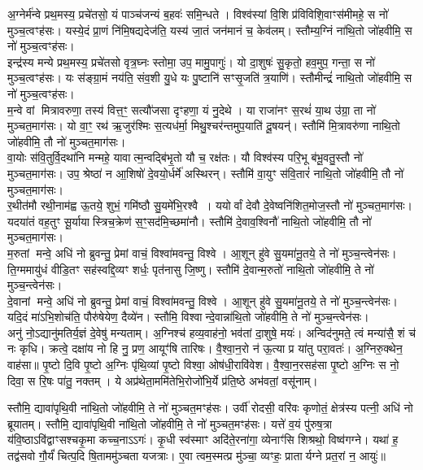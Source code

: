 अ॒ग्नेर्म॑न्वे प्रथ॒मस्य॒ प्रचे॑तसो॒ यं पाञ्च॑जन्यं ब॒हवः॑ समि॒न्धते। विश्व॑स्यां वि॒शि प्र॑विविशि॒वाꣳस॑मीमहे॒ स नो॑ मुञ्च॒त्वꣳह॑सः। यस्ये॒दं प्रा॒णं नि॑मि॒षद्यदेज॑ति॒ यस्य॑ जा॒तं जन॑मानं च॒ केव॑लम्। स्तौम्य॒ग्निं ना॑थि॒तो जो॑हवीमि॒ स नो॑ मुञ्च॒त्वꣳह॑सः।\\
इन्द्र॑स्य मन्ये प्रथ॒मस्य॒ प्रचे॑तसो वृत्र॒घ्नः स्तोमा॒ उप॒ मामु॒पागुः॑। यो दा॒शुषः॑ सु॒कृतो॒ हव॒मुप॒ गन्ता॒ स नो॑ मुञ्च॒त्वꣳह॑सः। यः स॑ङ्ग्रा॒मं नय॑ति॒ संव॒शी यु॒धे यः पु॒ष्टानि॑ सꣳसृ॒जति॑ त्र॒याणि॑। स्तौमीन्द्रं॑ नाथि॒तो जो॑हवीमि॒ स नो॑ मुञ्च॒त्वꣳह॑सः।\\
म॒न्वे वां मित्रावरुणा॒ तस्य॑ वित्त॒ꣳ॒ सत्यौ॑जसा दृꣳहणा॒ यं नु॒देथे। या राजा॑नꣳ स॒रथं॑ या॒थ उ॑ग्रा॒ ता नो॑ मुञ्चत॒माग॑सः। यो वा॒ꣳ॒ रथ॑ ऋ॒जुर॑श्मिः स॒त्यध॑र्मा॒ मिथु॒श्चर॑न्तमुप॒याति॑ दू॒षयन्॑। स्तौमि॑ मि॒त्रावरु॑णा नाथि॒तो जो॑हवीमि॒ तौ नो॑ मुञ्चत॒माग॑सः।\\
वा॒योः स॑वि॒तुर्वि॒दथा॑नि मन्महे॒ यावात्म॒न्वद्बि॑भृ॒तो यौ च॒ रक्ष॑तः। यौ विश्व॑स्य परि॒भू ब॑भू॒वतु॒स्तौ नो॑ मुञ्चत॒माग॑सः। उप॒ श्रेष्ठा॑ न आ॒शिषो॑ दे॒वयो॒र्धर्मे॑ अस्थिरन्। स्तौमि॑ वा॒युꣳ स॑वि॒तारं॑ नाथि॒तो जो॑हवीमि॒ तौ नो॑ मुञ्चत॒माग॑सः।\\
र॒थीत॑मौ रथी॒नाम॑ह्व ऊ॒तये॒ शुभं॒ गमि॑ष्ठौ सु॒यमे॑भि॒रश्वै। ययोर्वां देवौ दे॒वेष्वनि॑शित॒मोज॒स्तौ नो॑ मुञ्चत॒माग॑सः। यदया॑तं वह॒तुꣳ सू॒र्यायास्त्रिच॒क्रेण॑ स॒ꣳ॒सद॑मि॒च्छमा॑नौ। स्तौमि॑ दे॒वाव॒श्विनौ॑ नाथि॒तो जो॑हवीमि॒ तौ नो॑ मुञ्चत॒माग॑सः।\\
म॒रुतां मन्वे॒ अधि॑ नो ब्रुवन्तु॒ प्रेमां वाचं॒ विश्वा॑मवन्तु॒ विश्वे। आ॒शून् हु॑वे सु॒यमा॑नू॒तये॒ ते नो॑ मुञ्च॒न्त्वेन॑सः। ति॒ग्ममायु॑धं वीडि॒तꣳ सह॑स्वद्दि॒व्यꣳ शर्धः॒ पृत॑नासु जि॒ष्णु। स्तौमि॑ दे॒वान्म॒रुतो॑ नाथि॒तो जो॑हवीमि॒ ते नो॑ मुञ्च॒न्त्वेन॑सः।\\
दे॒वानां मन्वे॒ अधि॑ नो ब्रुवन्तु॒ प्रेमां वाचं॒ विश्वा॑मवन्तु॒ विश्वे। आ॒शून् हु॑वे सु॒यमा॑नू॒तये॒ ते नो॑ मुञ्च॒न्त्वेन॑सः। यदि॒दं मा॑ऽभि॒शोच॑ति॒ पौरु॑षेयेण॒ दैव्ये॑न। स्तौमि॒ विश्वान्दे॒वान्ना॑थि॒तो जो॑हवीमि॒ ते नो॑ मुञ्च॒न्त्वेन॑सः।\\
अनु॑ नो॒ऽद्यानु॑मतिर्य॒ज्ञं दे॒वेषु॑ मन्यताम्। अ॒ग्निश्च॑ हव्य॒वाह॑नो॒ भव॑तां दा॒शुषे॒ मयः॑। अन्विद॑नुमते॒ त्वं मन्या॑सै॒ शं च॑ नः कृधि। क्रत्वे॒ दक्षा॑य नो हि नु॒ प्रण॒ आयूꣳ॑षि तारिषः।
वै॒श्वा॒न॒रो न॑ ऊ॒त्या प्र या॑तु  परा॒वतः॑। अ॒ग्निरु॒क्थेन॒ वाह॑सा॥
पृ॒ष्टो दि॒वि पृ॒ष्टो अ॒ग्निः पृ॑थि॒व्यां पृ॒ष्टो विश्वा॒ ओष॑धी॒रावि॑वेश। वै॒श्वा॒न॒रसह॑सा पृ॒ष्टो अ॒ग्निः स नो॒ दिवा॒ स रि॒षः पा॑तु॒ नक्तम्।  ये अप्र॑थेता॒ममि॑तेभि॒रोजो॑भि॒र्ये प्र॑ति॒ष्ठे अभ॑वतां॒ वसू॑नाम्। 

स्तौमि॒ द्यावा॑पृथि॒वी ना॑थि॒तो जो॑हवीमि॒ ते नो॑ मुञ्चत॒मꣳह॑सः। उर्वी॑ रोदसी॒ वरि॑वः कृणोतं॒ क्षेत्र॑स्य पत्नी॒ अधि॑ नो ब्रूयातम्। 
स्तौमि॒ द्यावा॑पृथि॒वी ना॑थि॒तो जो॑हवीमि॒ ते नो॑ मुञ्चत॒मꣳह॑सः। यत्ते॑ व॒यं पु॑रुष॒त्रा य॑वि॒ष्ठाऽवि॑द्वाꣳसश्चकृ॒मा कच्च॒नाऽऽगः॑। 
कृ॒धी स्व॑स्माꣳ अदि॑ते॒रना॑गा॒ व्येनाꣳ॑सि शिश्रथो॒ विष्व॑गग्ने। यथा॑ ह॒ तद्व॑सवो गौ॒र्यं॑ चित्प॒दि षि॒ताममु॑ञ्चता यजत्राः। ए॒वा त्वम॒स्मत्प्र मु॑ञ्चा॒ व्यꣳहः॒ प्रातार्यग्ने प्रत॒रां न॒ आयुः॑॥

